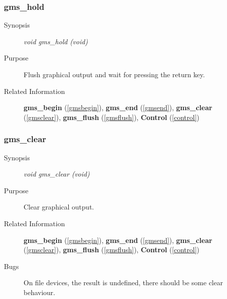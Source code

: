 \newpage



\subsubsection{gms\_hold\label{gmshold}}
\begin{description}
\item[Synopsis]\mbox{}


{\em void    gms\_hold (void)\/}
\item[Purpose]\mbox{}


Flush graphical output and wait for pressing the 
return key.
\item[Related Information]\mbox{}


{\bf gms\_begin} (\ref{gmsbegin}), 
{\bf gms\_end} (\ref{gmsend}), 
{\bf gms\_clear} (\ref{gmsclear}),  
{\bf gms\_flush} (\ref{gmsflush}), 
{\bf Control} (\ref{control})
\end{description}



\newpage



\subsubsection{gms\_clear\label{gmsclear}}
\begin{description}
\item[Synopsis]\mbox{}


{\em void    gms\_clear (void)\/}
\item[Purpose]\mbox{}


Clear graphical output.
\item[Related Information]\mbox{}


{\bf gms\_begin} (\ref{gmsbegin}), 
{\bf gms\_end} (\ref{gmsend}), 
{\bf gms\_clear} (\ref{gmsclear}), 
{\bf gms\_flush} (\ref{gmsflush}), 
{\bf Control} (\ref{control})
\item[Bugs]\mbox{}


On file devices, the result is undefined, there should be some
clear behaviour.
\end{description}



\newpage



